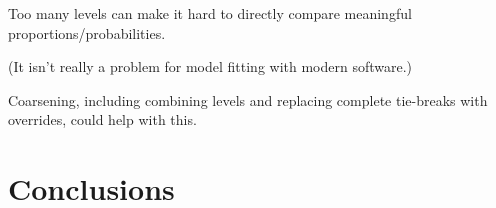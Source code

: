 \documentclass[
  11pt,
  fleqn
]{article}
\begin{document}
Too many levels can make it hard to directly compare meaningful
proportions/probabilities.

(It isn't really a problem for model fitting with modern software.)

Coarsening, including combining levels and replacing complete
tie-breaks with overrides, could help with this.

\section{Conclusions}

\newpage

\printbibliography
\end{document}
